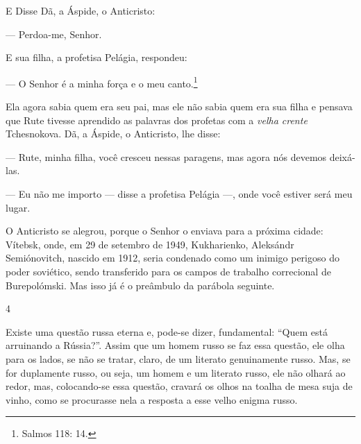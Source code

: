 E Disse Dã, a Áspide, o Anticristo:

--- Perdoa-me, Senhor.

E sua filha, a profetisa Pelágia, respondeu:

--- O Senhor é a minha força e o meu canto.\footnote{Salmos 118: 14.}

Ela agora sabia quem era seu pai, mas ele não sabia quem era sua filha e
pensava que Rute tivesse aprendido as palavras dos profetas com a
\emph{velha crente} Tchesnokova. Dã, a Áspide, o Anticristo, lhe disse:

--- Rute, minha filha, você cresceu nessas paragens, mas agora nós
devemos deixá-las.

--- Eu não me importo --- disse a profetisa Pelágia ---, onde você
estiver será meu lugar.

O Anticristo se alegrou, porque o Senhor o enviava para a próxima
cidade: Vítebsk, onde, em 29 de setembro de 1949, Kukharienko, Aleksándr
Semiónovitch, nascido em 1912, seria condenado como um inimigo perigoso
do poder soviético, sendo transferido para os campos de trabalho
correcional de Burepolómski. Mas isso já é o preâmbulo da parábola
seguinte.

4

Existe uma questão russa eterna e, pode-se dizer, fundamental: ``Quem
está arruinando a Rússia?''. Assim que um homem russo se faz essa
questão, ele olha para os lados, se não se tratar, claro, de um literato
genuinamente russo. Mas, se for duplamente russo, ou seja, um homem e um
literato russo, ele não olhará ao redor, mas, colocando-se essa questão,
cravará os olhos na toalha de mesa suja de vinho, como se procurasse
nela a resposta a esse velho enigma russo.

